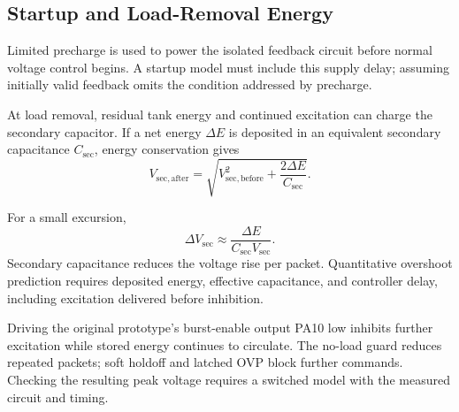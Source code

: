 \subsection{Startup and Load-Removal Energy}
\label{sec:sim-startup}

Limited precharge is used to power the isolated feedback circuit before normal voltage control begins. A startup model must include this supply delay; assuming initially valid feedback omits the condition addressed by precharge.

\begin{samepage}
At load removal, residual tank energy and continued excitation can charge the secondary capacitor. If a net energy \(\Delta E\) is deposited in an equivalent secondary capacitance \(C_{\mathrm{sec}}\), energy conservation gives
\begin{equation}
V_{\mathrm{sec,after}}=
\sqrt{V_{\mathrm{sec,before}}^2+\frac{2\Delta E}{C_{\mathrm{sec}}}}.
\label{eq:sim-secondary-energy}
\end{equation}
\end{samepage}
For a small excursion,
\begin{equation}
\Delta V_{\mathrm{sec}}\approx
\frac{\Delta E}{C_{\mathrm{sec}}V_{\mathrm{sec}}}.
\end{equation}
Secondary capacitance reduces the voltage rise per packet. Quantitative overshoot prediction requires deposited energy, effective capacitance, and controller delay, including excitation delivered before inhibition.

Driving the original prototype's burst-enable output PA10 low inhibits further excitation while stored energy continues to circulate. The no-load guard reduces repeated packets; soft holdoff and latched OVP block further commands. Checking the resulting peak voltage requires a switched model with the measured circuit and timing.
